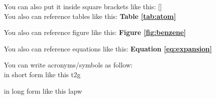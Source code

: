 You can also put it inside square brackets like this: \hspace{1cm}
[\cite{hohenberg1964inhomogeneous}]   \\

You also can reference tables like this: \hspace{1cm} 
\textbf{Table \ref{tab:atom}}


You also can reference figure like this: \hspace{1cm} 
\textbf{Figure \ref{fig:benzene}}


You also can reference equations like this: \hspace{1cm} 
\textbf{Equation \ref{eq:expansion}} \\



You can write acronyms/symbols as follow: \\

in short form like this \hspace{1cm}
\acs{t2g}

in long form like this \hspace{1cm}
\acl{lapw}

















